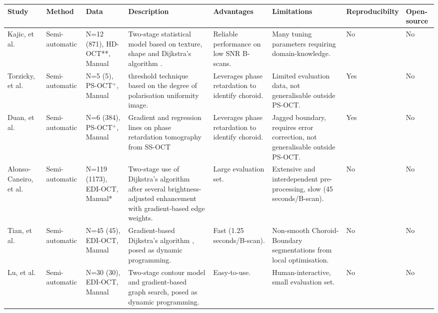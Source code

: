 \scriptsize

{\begin{longtable}{p{1.5cm}p{1.5cm}p{2cm}p{5cm}p{3cm}p{3cm}P{1cm}p{1cm}}
\toprule
Study & Method & Data & Description & Advantages & Limitations & Reproducibilty & Open-source \\ \hline
\endfirsthead
\endhead
\midrule
\endfoot
\endlastfoot
Kajic, et al. \cite{kajic2012automated} & Semi-automatic & N=12 (871), HD-OCT**, Manual & Two-stage statistical model based on texture, shape and Dijkstra's algorithm \cite{dijkstra2022note}. & Reliable performance on low SNR B-scans. & Many tuning parameters requiring domain-knowledge. & No & No \\

Torzicky, et al. \cite{torzicky2012automated} & Semi-automatic & N=5 (5), PS-OCT$^+$, Manual & threshold technique based on the degree of polarisation uniformity image. & Leverages phase retardation to identify choroid. & Limited evaluation data, not generalisable outside PS-OCT. & Yes & No \\

Duan, et al. \cite{duan2012automated} & Semi-automatic & N=6 (384), PS-OCT$^+$, Manual & Gradient and regression lines on phase retardation tomography from SS-OCT & Leverages phase retardation to identify choroid. & Jagged boundary, requires error correction, not generalisable outside PS-OCT. & Yes & No \\

Alonso-Caneiro, et al. \cite{alonso2013automatic} & Semi-automatic & N=119 (1173), EDI-OCT, Manual* & Two-stage use of Dijkstra's algorithm \cite{dijkstra2022note} after several brightness-adjusted enhancement with gradient-based edge weights. & Large evaluation set. & Extensive and interdependent pre-processing, slow (45 seconds/B-scan). & No & No \\

Tian, et al. \cite{tian2013automatic} & Semi-automatic & N=45 (45), EDI-OCT, Manual & Gradient-based Dijkstra's algorithm \cite{dijkstra2022note}, posed as dynamic programming. & Fast (1.25 seconds/B-scan). & Non-smooth Choroid-Boundary segmentations from local optimisation. & No & No \\

Lu, et al. \cite{lu2013automated} & Semi-automatic & N=30 (30), EDI-OCT, Manual & Two-stage contour model and gradient-based graph search, posed as dynamic programming. & Easy-to-use. &  Human-interactive, small evaluation set. & No & No \\


\end{longtable}}
